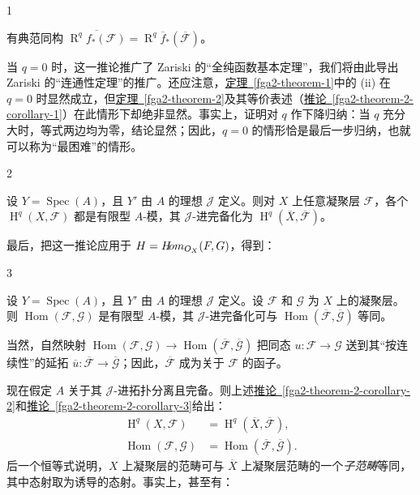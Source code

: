 \begin{corollary}{1}\label{fga2-theorem-2-corollary-1}\skipsinglepar
\par{}有典范同构 \(\overline {\operatorname {R}^q f_*(\mathscr {F})} = \operatorname {R}^q\overline {f}_*(\overline {\mathscr {F}})\)。\end{corollary}
\par{}当 \(q=0\) 时，这一推论推广了 Zariski 的“全纯函数基本定理”，我们将由此导出 Zariski 的“连通性定理”的推广。还应注意，\hyperref[fga2-theorem-1]{定理~\ref*{fga2-theorem-1}}中的 (ii) 在 \(q=0\) 时显然成立，但\hyperref[fga2-theorem-2]{定理~\ref*{fga2-theorem-2}}及其等价表述（\hyperref[fga2-theorem-2-corollary-1]{推论~\ref*{fga2-theorem-2-corollary-1}}）在此情形下却绝非显然。事实上，证明对 \(q\) 作下降归纳：当 \(q\) 充分大时，等式两边均为零，结论显然；因此，\(q=0\) 的情形恰是最后一步归纳，也就可以称为“最困难”的情形。
\begin{corollary}{2}\label{fga2-theorem-2-corollary-2}\skipsinglepar
\par{}设 \(Y=\operatorname {Spec}(A)\)，且 \(Y'\) 由 \(A\) 的理想 \(\mathscr {J}\) 定义。则对 \(X\) 上任意凝聚层 \(\mathscr {F}\)，各个 \(\operatorname {H}^q(X,\mathscr {F})\) 都是有限型 \(A\)-模，其 \(\mathscr {J}\)-进完备化为 \(\operatorname {H}^q(\overline {X},\overline {\mathscr {F}})\)。\end{corollary}
\par{}最后，把这一推论应用于 \(H=\mathscr {H}\kern  -2.5pt\mathit {om}_{\mathcal {O}_X}(\mathscr {F},\mathscr {G})\)，得到：
\begin{corollary}{3}\label{fga2-theorem-2-corollary-3}\skipsinglepar
\par{}设 \(Y=\operatorname {Spec}(A)\)，且 \(Y'\) 由 \(A\) 的理想 \(\mathscr {J}\) 定义。设 \(\mathscr {F}\) 和 \(\mathscr {G}\) 为 \(X\) 上的凝聚层。则 \(\operatorname {Hom}(\mathscr {F},\mathscr {G})\) 是有限型 \(A\)-模，其 \(\mathscr {J}\)-进完备化可与 \(\operatorname {Hom}(\overline {\mathscr {F}},\overline {\mathscr {G}})\) 等同。\end{corollary}
\par{}当然，自然映射 \(\operatorname {Hom}(\mathscr {F},\mathscr {G})\to \operatorname {Hom}(\overline {\mathscr {F}},\overline {\mathscr {G}})\) 把同态 \(u\colon \mathscr {F}\to \mathscr {G}\) 送到其“按连续性”的延拓 \(\overline {u}\colon \overline {\mathscr {F}}\to \overline {\mathscr {G}}\)；因此，\(\overline {\mathscr {F}}\) 成为关于 \(\mathscr {F}\) 的函子。
\par{}现在假定 \(A\) 关于其 \(\mathscr {J}\)-进拓扑分离且完备。则上述\hyperref[fga2-theorem-2-corollary-2]{推论~\ref*{fga2-theorem-2-corollary-2}}和\hyperref[fga2-theorem-2-corollary-3]{推论~\ref*{fga2-theorem-2-corollary-3}}给出：\[     \begin {aligned}       \operatorname {H}^q(X,\mathscr {F}) &= \operatorname {H}^q(\overline {X},\overline {\mathscr {F}}),     \\\operatorname {Hom}(\mathscr {F},\mathscr {G}) &= \operatorname {Hom}(\overline {\mathscr {F}},\overline {\mathscr {G}}).     \end {aligned}   \] 后一个恒等式说明，\(X\) 上凝聚层的范畴可与 \(\overline {X}\) 上凝聚层范畴的一个\emph{子范畴}等同，其中态射取为诱导的态射。事实上，甚至有：
